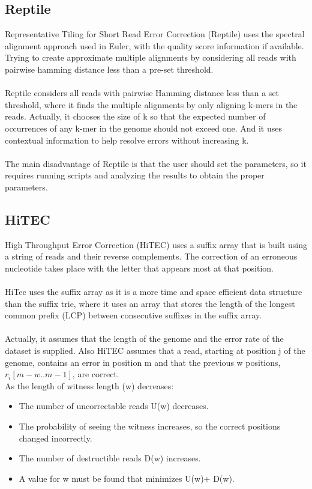 \documentclass[12pt,openany]{llncs}
\begin{document}
\subsection{Reptile}
Representative Tiling for Short Read Error Correction (Reptile) \cite{Reptile} uses the spectral alignment approach used in Euler, with the quality score information if available. Trying to create approximate multiple alignments by considering all reads with pairwise hamming distance less than a pre-set threshold. 
\\
\\
Reptile considers all reads with pairwise Hamming distance less than a set threshold, where it finds the multiple alignments by only aligning k-mers in the reads. Actually, it chooses the size of k so that the expected number of occurrences of any k-mer in the genome should not exceed one. And it uses contextual information to help resolve errors without increasing k.
\\
\\
The main disadvantage of Reptile is that the user should set the parameters, so it
requires running scripts and analyzing the results to obtain the proper parameters.

\subsection{HiTEC}
High Throughput Error Correction (HiTEC) \cite{HiTec} uses a suffix array that is built using a string of reads and their reverse complements. The correction of an erroneous nucleotide takes place with the letter that appears most at that position.
\\
\\
HiTec uses the suffix array as it is a more time and space efficient data structure than the suffix trie, where it uses an array that stores the length of the longest common prefix (LCP) between consecutive suffixes in the suffix array.
\\
\\
Actually, it assumes that the length of the genome and the error rate of the dataset is supplied. Also HiTEC assumes that a read, starting at position j of the genome, contains an error in position m and that the previous w positions, $r_{i} [m - w..m - 1]$, are correct.
\\
As the length of witness length (w) decreases:

\begin{itemize}
	\item The number of uncorrectable reads U(w) decreases.
	\item The probability of seeing the witness increases, so the correct positions changed incorrectly. 
	\item The number of destructible reads D(w) increases.
	\item A value for w must be found that minimizes U(w)+ D(w). 
\end{itemize}
\end{document}
